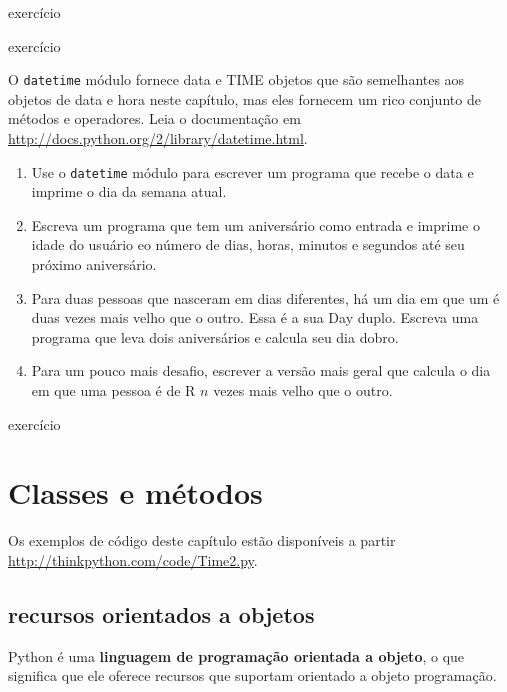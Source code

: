 \documentclass[10pt]{book}
\begin{document}
\begin{v erbatim}
{\begin{}
\end{} exercício


\begin{} exercício

O {\tt datetime} módulo fornece {data \tt} e {TIME \tt} objetos
que são semelhantes aos objetos de data e hora neste capítulo, mas
eles fornecem um rico conjunto de métodos e operadores. Leia o
documentação em \url{http://docs.python.org/2/library/datetime.html}.

\begin{enumerate}

\item Use o {\tt datetime} módulo para escrever um programa que recebe o
  data e imprime o dia da semana atual.

\item Escreva um programa que tem um aniversário como entrada e imprime o
  idade do usuário eo número de dias, horas, minutos e segundos até
  seu próximo aniversário.

\item Para duas pessoas que nasceram em dias diferentes, há um dia em que um
  é duas vezes mais velho que o outro. Essa é a sua Day duplo. Escreva uma
  programa que leva dois aniversários e calcula seu dia dobro.

\item Para um pouco mais desafio, escrever a versão mais geral que
  calcula o dia em que uma pessoa é de R $ n $ vezes mais velho que o outro.

\end{enumerate}

\end{} exercício


\chapter{Classes e métodos}

Os exemplos de código deste capítulo estão disponíveis a partir
\url{http://thinkpython.com/code/Time2.py}.

\section{recursos orientados a objetos}

Python é uma {\bf linguagem de programação orientada a objeto}, o que significa
que ele oferece recursos que suportam orientado a objeto
programação.

}
\end{v erbatim}
\end{document}

